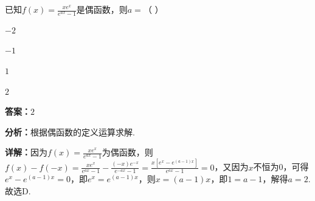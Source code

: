 \begin{question}[points=5]
已知$f(x)=\frac{xe^x}{e^{ax}-1}$是偶函数，则$a=$（   ）
\begin{choices}
  \item $-2$
  \item $-1$
  \item $1$
  \item $2$
\end{choices}
\begin{solution}
\textbf{答案：}$2$

\textbf{分析：}根据偶函数的定义运算求解.

\textbf{详解：}因为$f(x)=\frac{xe^x}{e^{ax}-1}$为偶函数，则$f(x)-f(-x)=\frac{xe^x}{e^{ax}-1}-\frac{(-x)e^{-x}}{e^{-ax}-1}=\frac{x[e^x-e^{(a-1)x}]}{e^{ax}-1}=0$，又因为$x$不恒为0，可得$e^x-e^{(a-1)x}=0$，即$e^x=e^{(a-1)x}$，则$x=(a-1)x$，即$1=a-1$，解得$a=2$. 故选D.
\end{solution}
\end{question}


